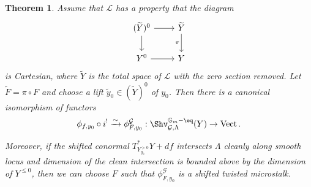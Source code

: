 \documentclass[9pt]{amsart}
\newcommand{\bG}{{\mathbb G}}
\newcommand{\cG}{{\mathcal G}}
\newcommand{\cL}{{\mathcal L}}
\newtheorem{thm}[subsubsection]{Theorem}
\DeclareMathOperator{\Vect}{{Vect}}
\numberwithin{equation}{section}
\begin{document}
\begin{thm}\cite[Theorem 2.2.2, Proposition 2.3.1]{NT}\label{extension of NT}
	Assume that $\cL$ has a property that the diagram 
	\[
\begin{tikzcd}
(\widetilde{Y})^{0}\ar[r, rightarrow, ""']\ar[d, rightarrow, ""']&   	\widetilde{Y}\ar[d, rightarrow, "\pi"']  \\
Y^{0}\ar[r, rightarrow, ""']&   Y
\end{tikzcd}
\]
is Cartesian, where $\widetilde{Y}$ is the total space of $\cL$ with the zero section removed. Let $\widetilde{F} = \pi \circ F$ and choose a lift $\widetilde{y}_0 \in (\widetilde{Y})^{0}$ of $y_0$. Then there is a canonical isomorphism of functors 
\begin{equation}\label{extension of NT functors}
	\phi_{f, y_0} \circ i^! \xrightarrow{\sim} \phi^{\cG}_{F, {y}_0} : \Shv_{\cG, \Lambda}^{\bG_m-\eq}(Y) \rightarrow \Vect.
\end{equation}

Moreover, if the shifted conormal $T^*_{Y^{>0}_{y_0}} Y +df$ intersects $\Lambda$ cleanly along smooth locus and dimension of the clean intersection is bounded above by the dimension of $Y^{\leq 0}$, then we can choose $F$ such that $\phi^{\cG}_{F, {y}_0}$ is a shifted twisted microstalk. 
\end{thm}
\end{document}
